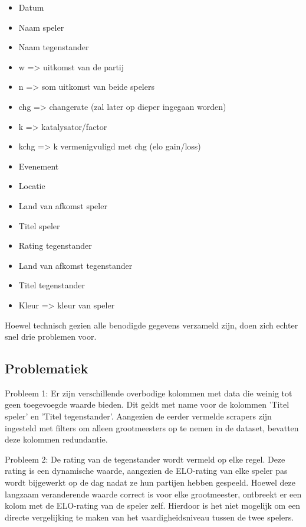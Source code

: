 \begin{itemize}
    \item Datum
    \item Naam speler
    \item Naam tegenstander
    \item w => uitkomst van de partij
    \item n => som uitkomst van beide spelers
    \item chg => changerate (zal later op dieper ingegaan worden)
    \item k => katalysator/factor
    \item kchg => k vermenigvuligd met chg (elo gain/loss)
    \item Evenement
    \item Locatie
    \item Land van afkomst speler
    \item Titel speler
    \item Rating tegenstander
    \item Land van afkomst tegenstander 
    \item Titel tegenstander
    \item Kleur => kleur van speler
\end{itemize}

Hoewel technisch gezien alle benodigde gegevens verzameld zijn, doen zich echter snel drie problemen voor.

\subsection{Problematiek}

Probleem 1: Er zijn verschillende overbodige kolommen met data die weinig tot geen toegevoegde waarde bieden. Dit geldt met name voor de kolommen 'Titel speler' en 'Titel tegenstander'. Aangezien de eerder vermelde scrapers zijn ingesteld met filters om alleen grootmeesters op te nemen in de dataset, bevatten deze kolommen redundantie.

Probleem 2: De rating van de tegenstander wordt vermeld op elke regel. Deze rating is een dynamische waarde, aangezien de ELO-rating van elke speler pas wordt bijgewerkt op de dag nadat ze hun partijen hebben gespeeld. Hoewel deze langzaam veranderende waarde correct is voor elke grootmeester, ontbreekt er een kolom met de ELO-rating van de speler zelf. Hierdoor is het niet mogelijk om een directe vergelijking te maken van het vaardigheidsniveau tussen de twee spelers.

